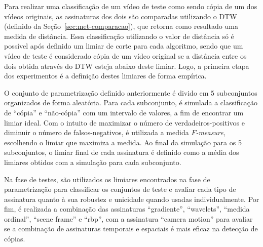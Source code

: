 Para realizar uma classificação de um vídeo de teste como sendo cópia de um dos vídeos originais, as assinaturas dos dois são comparadas utilizando o DTW (definido da Seção~\ref{sec:met-comparacao}), que retorna como resultado uma medida de distância. Essa classificação utilizando o valor de distância só é possível após definido um limiar de corte para cada algoritmo, sendo que um vídeo de teste é considerado cópia de um vídeo original se a distância entre os dois obtida através do DTW esteja abaixo deste limiar. Logo, a primeira etapa dos experimentos é a definição destes limiares de forma empírica.

O conjunto de parametrização definido anteriormente é divido em 5 subconjuntos organizados de forma aleatória. Para cada subconjunto, é simulada a classificação de ``cópia'' e ``não-cópia'' com um intervalo de valores, a fim de encontrar um limiar ideal. Com o intuito de maximizar o número de verdadeiros-positivos e diminuir o número de falsos-negativos, é utilizada a medida \textit{$F$-measure}, escolhendo o limiar que maximiza a medida. Ao final da simulação para os 5 subconjuntos, o limiar final de cada assinatura é definido como a média dos limiares obtidos com a simulação para cada subconjunto.

Na fase de testes, são utilizados os limiares encontrados na fase de parametrização para classificar os conjuntos de teste e avaliar cada tipo de assinatura quanto à sua robustez e unicidade quando usadas individualmente. Por fim, é realizada a combinação das assinaturas ``gradiente'', ``wavelets'', ``medida ordinal'', ``scene frame'' e ``rbp'', com a assinatura ``camera motion'' para avaliar se a combinação de assinaturas temporais e espaciais é mais eficaz na detecção de cópias.
